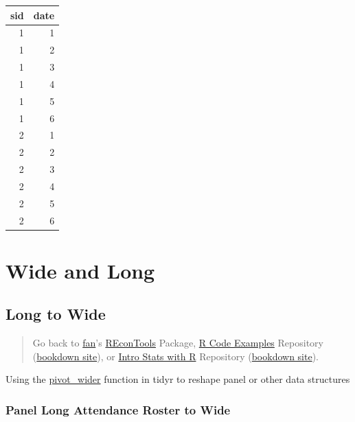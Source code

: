 \documentclass[
]{book}
\begin{document}
\begin{table}[!h]
\centering
\begin{tabular}{r|r}
\hline
sid & date\\
\hline
\rowcolor{gray!6}  1 & 1\\
\hline
1 & 2\\
\hline
\rowcolor{gray!6}  1 & 3\\
\hline
1 & 4\\
\hline
\rowcolor{gray!6}  1 & 5\\
\hline
1 & 6\\
\hline
\rowcolor{gray!6}  2 & 1\\
\hline
2 & 2\\
\hline
\rowcolor{gray!6}  2 & 3\\
\hline
2 & 4\\
\hline
\rowcolor{gray!6}  2 & 5\\
\hline
2 & 6\\
\hline
\end{tabular}
\end{table}

\hypertarget{wide-and-long}{%
\section{Wide and Long}\label{wide-and-long}}

\hypertarget{long-to-wide}{%
\subsection{Long to Wide}\label{long-to-wide}}

\begin{quote}
Go back to \href{http://fanwangecon.github.io/}{fan}'s \href{https://fanwangecon.github.io/REconTools/}{REconTools} Package, \href{https://fanwangecon.github.io/R4Econ/}{R Code Examples} Repository (\href{https://fanwangecon.github.io/R4Econ/bookdown}{bookdown site}), or \href{https://fanwangecon.github.io/Stat4Econ/}{Intro Stats with R} Repository (\href{https://fanwangecon.github.io/Stat4Econ/bookdown}{bookdown site}).
\end{quote}

Using the \href{https://tidyr.tidyverse.org/reference/pivot_wider.html}{pivot\_wider} function in tidyr to reshape panel or other data structures

\hypertarget{panel-long-attendance-roster-to-wide}{%
\subsubsection{Panel Long Attendance Roster to Wide}\label{panel-long-attendance-roster-to-wide}}
\end{document}
